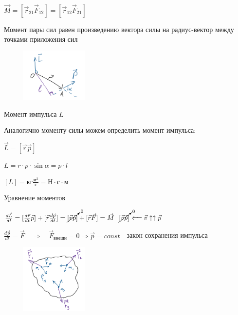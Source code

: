 \documentclass[12pt]{article}
\begin{document}
\begin{enumerate}
\begin{minipage}{\textwidth}
            $\vec{M} = [\vec{r}_{21} \vec{F}_{12}] = [\vec{r}_{12} \vec{F}_{21}]$

            Момент пары сил равен произведению вектора силы на радиус-вектор между точками приложения сил

            \begin{figure}
                \includegraphics[width=0.3\textwidth]{physics1/images/physics1_2024_10_07_4}
            \end{figure}

            \item Момент импульса $L$

            Аналогично моменту силы можем определить момент импульса:

            $\vec{L} = [\vec{r} \vec{p}]$
            
            $L = r \cdot p \cdot \sin\alpha = p \cdot l$
            
            $[L] = \text{кг} \frac{\text{м}^2}{\text{с}} = \text{Н} \cdot \text{с} \cdot \text{м}$

            \item Уравнение моментов

            $\frac{d\vec{L}}{dt} = [\frac{d\vec{r}}{dt}\vec{p}] + [\vec{r} \frac{d\vec{p}}{dt}] = \cancelto{0}{[\vec{v} \vec{p}]} + [\vec{r} \vec{F}] = \vec{M}$ \hfill $\cancelto{0}{[\vec{v} \vec{p}]} \Longleftarrow \vec{v} \uparrow\uparrow \vec{p}$

        \end{minipage}

        \smallvspace

        $\frac{d\vec{p}}{dt} = \vec{F} \quad \Longrightarrow \quad \vec{F}_\text{внешн} = 0 \Longrightarrow \vec{p} = const$ - закон сохранения импульса

        \smallvspace

        \begin{minipage}{\textwidth}
            \begin{figure}
                \includegraphics[width=0.3\textwidth]{physics1/images/physics1_2024_10_07_5}
            \end{figure}


\end{minipage}
\end{enumerate}
\end{document}
